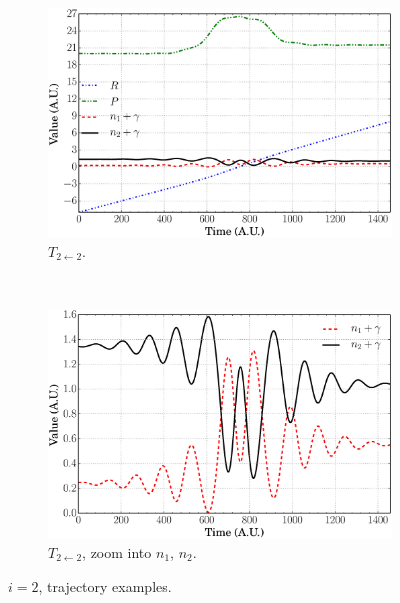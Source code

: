 \documentclass[xetex,mathserif,serif]{beamer}
\newcommand{\ttt}{$ T_{2\leftarrow2} $}
\begin{document}
\begin{frame}
{\begin{figure}
\begin{subfigure}[t]{0.45\textwidth}
\includegraphics[width=\textwidth]{dc_traj_t22.eps}
\vspace{-0.1cm}
\caption{{\fontsize{7}{8}\selectfont \ttt.}}
\end{subfigure}
~
\begin{subfigure}[t]{0.45\textwidth}
\centering
\includegraphics[width=\textwidth]{dc_traj_t22_e.eps}
\vspace{-0.1cm}
\caption{{\fontsize{7}{8}\selectfont \ttt, zoom into $ n_{1}$, $n_{2} $.}}
\end{subfigure}
\caption{$ i = 2 $, trajectory examples.}
\end{figure}
}{}


\end{frame}
\end{document}
